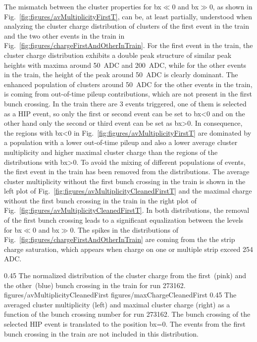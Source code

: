 The mismatch between the cluster properties for bx$\ll$0 and bx$\gg$0, as shown in Fig.~\ref{fig:figures/avMultiplicityFirstT}, can be, at least partially, understood when analyzing the cluster charge distribution of clusters of the first event in the train and the two other events in the train in Fig.~\ref{fig:figures/chargeFirstAndOtherInTrain}. For the first event in the train, the cluster charge distribution exhibits a double peak structure of similar peak heights with maxima around 50~ADC and 200~ADC, while for the other events in the train, the height of the peak around 50~ADC is clearly dominant. The enhanced population of clusters around 50~ADC for the other events in the train, is coming from out-of-time pileup contributions, which are not present in the first bunch crossing. In the train there are 3 events triggered, one of them is selected as a HIP event, so only the first or second event can be set to bx<0 and on the other hand only the second or third event can be set as bx>0. In consequence, the regions with bx<0 in Fig.~\ref{fig:figures/avMultiplicityFirstT} are dominated by a population with a lower out-of-time pileup and also a lower average cluster multiplicity and higher maximal cluster charge than the regions of the distributions with bx>0. To avoid the mixing of different populations of events, the first event in the train has been removed from the distributions. The average cluster multiplicity without the first bunch crossing in the train is shown in the left plot of Fig.~\ref{fig:figures/avMultiplicityCleanedFirstT} and the maximal charge without the first bunch crossing in the train in the right plot of Fig.~\ref{fig:figures/avMultiplicityCleanedFirstT}. In both distributions, the removal of the first bunch crossing leads to a significant equalization between the levels for bx$\ll$0 and bx$\gg$0. The spikes in the distributions of Fig.~\ref{fig:figures/chargeFirstAndOtherInTrain} are coming from the the strip charge saturation, which appears when charge on one or multiple strip exceed 254 ADC.

                 {0.45}       %
                 {The normalized distribution of the cluster charge from the first~(pink) and the other~(blue) bunch crossing in the train for run 273162.} 
                 {figures/avMultiplicityCleanedFirst} %
                 {figures/maxChargeCleanedFirst} %
                 {0.45}       %
                 {The averaged cluster multiplicity (left) and maximal cluster charge (right) as a function of the bunch crossing number for run 273162. The bunch crossing of the selected HIP event is translated to the position bx=0. The events from the first bunch crossing in the train are not included in this distribution. } %

